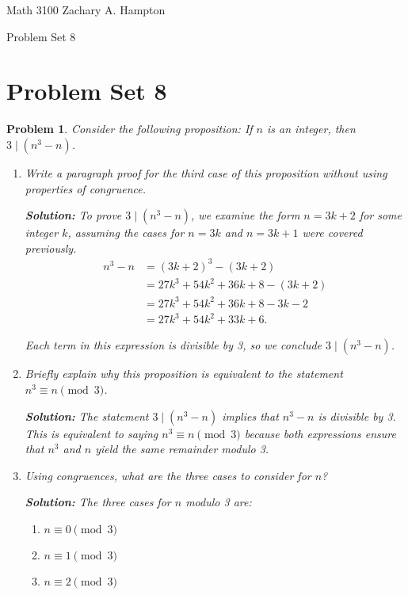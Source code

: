 \documentclass[12pt]{article}
\newtheorem{problem}{Problem}
\theoremstyle{definition}
\begin{document}
Math 3100 \hfill Zachary A. Hampton

Problem Set 8 \hfill 
{}

\bigskip

\section*{Problem Set 8}

\begin{problem}
Consider the following proposition: If \( n \) is an integer, then \( 3 \mid (n^3 - n) \).

\begin{enumerate}[label=(\alph*)]
    \item Write a paragraph proof for the third case of this proposition without using properties of congruence.
    
    \textbf{Solution:} To prove \( 3 \mid (n^3 - n) \), we examine the form \( n = 3k + 2 \) for some integer \( k \), assuming the cases for \( n = 3k \) and \( n = 3k + 1 \) were covered previously.
    \begin{align*}
        n^3 - n &= (3k + 2)^3 - (3k + 2) \\
        &= 27k^3 + 54k^2 + 36k + 8 - (3k + 2) \\
        &= 27k^3 + 54k^2 + 36k + 8 - 3k - 2 \\
        &= 27k^3 + 54k^2 + 33k + 6.
    \end{align*}

Each term in this expression is divisible by 3, so we conclude \( 3 \mid (n^3 - n) \).


    \item Briefly explain why this proposition is equivalent to the statement \( n^3 \equiv n \pmod{3} \).
    
    \textbf{Solution:} The statement \( 3 \mid (n^3 - n) \) implies that \( n^3 - n \) is divisible by 3. This is equivalent to saying \( n^3 \equiv n \pmod{3} \) because both expressions ensure that \( n^3 \) and \( n \) yield the same remainder modulo 3.

    \item Using congruences, what are the three cases to consider for \( n \)?

    \textbf{Solution:} The three cases for \( n \) modulo 3 are:
    \begin{enumerate}
        \item \( n \equiv 0 \pmod{3} \)
        \item \( n \equiv 1 \pmod{3} \)
        \item \( n \equiv 2 \pmod{3} \)
    \end{enumerate}
    

\end{enumerate}
\end{problem}
\end{document}
